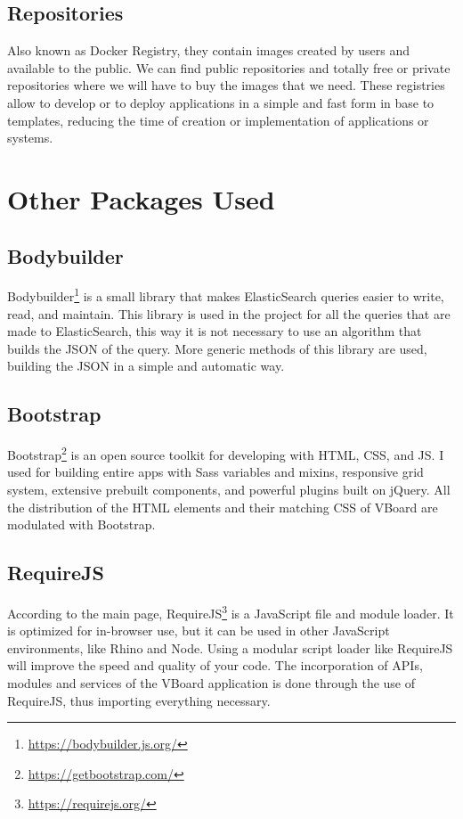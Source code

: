 \documentclass[a4paper, 12pt]{book}
\begin{document}
\subsection{Repositories}

Also known as Docker Registry, they contain images created by users and available to the public. We can find public repositories and totally free or private repositories where we will have to buy the images that we need. These registries allow to develop or to deploy applications in a simple and fast form in base to templates, reducing the time of creation or implementation of applications or systems.



\section{Other Packages Used}
\label{sec:otherspackage}
\subsection{Bodybuilder}
Bodybuilder\footnote{\url{https://bodybuilder.js.org/}} is a small library that makes ElasticSearch queries easier to write, read, and maintain. This library is used in the project for all the queries that are made to ElasticSearch, this way it is not necessary to use an algorithm that builds the JSON of the query. More generic methods of this library are used, building the JSON in a simple and automatic way.


\subsection{Bootstrap}
Bootstrap\footnote{\url{https://getbootstrap.com/}} is an open source toolkit for developing with HTML, CSS, and JS. I used for building entire apps with Sass variables and mixins, responsive grid system, extensive prebuilt components, and powerful plugins built on jQuery. All the distribution of the HTML elements and their matching CSS of VBoard are modulated with Bootstrap.

\subsection{RequireJS}
According to the main page, RequireJS\footnote{\url{https://requirejs.org/}} is a JavaScript file and module loader. It is optimized for in-browser use, but it can be used in other JavaScript environments, like Rhino and Node. Using a modular script loader like RequireJS will improve the speed and quality of your code. The incorporation of APIs, modules and services of the VBoard application is done through the use of RequireJS, thus importing everything necessary.
\end{document}
